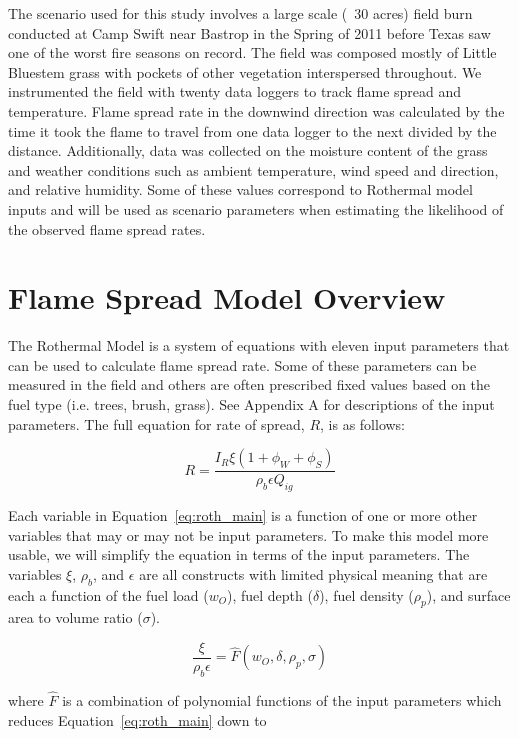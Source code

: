 \documentclass[11pt]{article}
\begin{document}
The scenario used for this study involves a large scale (~30 acres) field burn conducted at Camp Swift near Bastrop in the Spring of 2011 before Texas saw one of the worst fire seasons on record. The field was composed mostly of Little Bluestem grass with pockets of other vegetation interspersed throughout. We instrumented the field with twenty data loggers to track flame spread and temperature. Flame spread rate in the downwind direction was calculated by the time it took the flame to travel from one data logger to the next divided by the distance. Additionally, data was collected on the moisture content of the grass and weather conditions such as ambient temperature, wind speed and direction, and relative humidity. Some of these values correspond to Rothermal model inputs and will be used as scenario parameters when estimating the likelihood of the observed flame spread rates.


\section{Flame Spread Model Overview}

The Rothermal Model is a system of equations with eleven input parameters that can be used to calculate flame spread rate. Some of these parameters can be measured in the field and others are often prescribed fixed values based on the fuel type (i.e. trees, brush, grass). See Appendix A for descriptions of the input parameters. The full equation for rate of spread, $R$, is as follows:

\begin{equation}
R = \frac{I_R\xi(1+\phi_W+\phi_S)}{\rho_b\epsilon Q_{ig}}
\label{eq:roth_main}
\end{equation}

Each variable in Equation~\ref{eq:roth_main} is a function of one or more other variables that may or may not be input parameters. To make this model more usable, we will simplify the equation in terms of the input parameters. The variables $\xi$, $\rho_b$, and $\epsilon$ are all constructs with limited physical meaning that are each a function of the fuel load ($w_O$), fuel depth ($\delta$), fuel density ($\rho_p$), and surface area to volume ratio ($\sigma$). 

\begin{equation}
\frac{\xi}{\rho_b\epsilon} = \hat{F}(w_O, \delta, \rho_p, \sigma)
\label{eq:roth_fun}
\end{equation}

\noindent where $\hat{F}$ is a combination of polynomial functions of the input parameters which reduces Equation~\ref{eq:roth_main} down to
\end{document}

